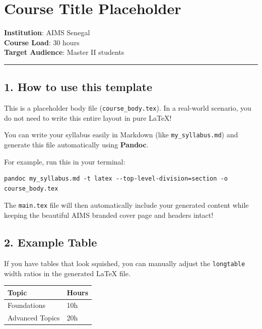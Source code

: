 
\section{Course Title Placeholder}\label{course-title-placeholder}

\textbf{Institution}: AIMS Senegal \\
\textbf{Course Load}: 30 hours \\
\textbf{Target Audience}: Master II students

\begin{center}\rule{0.5\linewidth}{0.5pt}\end{center}

\subsection{1. How to use this template}\label{how-to-use}

This is a placeholder body file (\texttt{course\_body.tex}). In a real-world scenario, you do not need to write this entire layout in pure LaTeX!

You can write your syllabus easily in Markdown (like \texttt{my\_syllabus.md}) and generate this file automatically using \textbf{Pandoc}.

For example, run this in your terminal:
\begin{verbatim}
pandoc my_syllabus.md -t latex --top-level-division=section -o course_body.tex
\end{verbatim}

The \texttt{main.tex} file will then automatically include your generated content while keeping the beautiful AIMS branded cover page and headers intact!

\subsection{2. Example Table}\label{example-table}

If you have tables that look squished, you can manually adjust the \texttt{longtable} width ratios in the generated LaTeX file.

\begin{longtable}[]{@{}ll@{}}
\toprule\noalign{}
Topic & Hours \\
\midrule\noalign{}
\endhead
\bottomrule\noalign{}
\endlastfoot
Foundations & 10h \\
Advanced Topics & 20h \\
\end{longtable}
